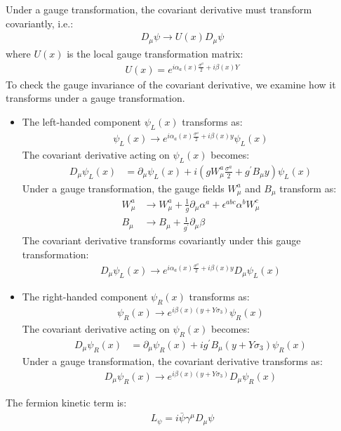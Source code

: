 \begin{enumerate}
Under a gauge transformation, the covariant derivative must transform covariantly, i.e.:
\begin{align}
    D_\mu \psi \to U(x) D_\mu \psi
\end{align}
where $U(x)$ is the local gauge transformation matrix:
\begin{align}
    U(x) = e^{\displaystyle i \alpha_a(x) \frac{\sigma^a}{2} + i \beta(x) Y}
\end{align}
To check the gauge invariance of the covariant derivative, we examine how it transforms under a gauge transformation.
\begin{itemize}
    \item The left-handed component $\psi_L(x)$ transforms as:
   \begin{align}
       \psi_L(x) \to e^{\displaystyle i \alpha_a(x) \frac{\sigma^a}{2} + i \beta(x) y} \psi_L(x)
   \end{align}
   The covariant derivative acting on $\psi_L(x)$ becomes:
   \begin{align}
       D_\mu \psi_L(x) &= \partial_\mu \psi_L(x) + i \left( g W_\mu^a \frac{\sigma^a}{2} + g^\prime  B_\mu y \right) \psi_L(x)
   \end{align}
   Under a gauge transformation, the gauge fields $W_\mu^a$ and $B_\mu$ transform as:
   \begin{align}
       W_\mu^a &\to W_\mu^a + \frac{1}{g} \partial_\mu \alpha^a + \epsilon^{abc} \alpha^b W_\mu^c \\
       B_\mu &\to B_\mu + \frac{1}{g^\prime } \partial_\mu \beta
   \end{align}
   The covariant derivative transforms covariantly under this gauge transformation:
   \begin{align}
       D_\mu \psi_L(x) \to e^{\displaystyle i \alpha_a(x) \frac{\sigma^a}{2} + i \beta(x) y} D_\mu \psi_L(x)
   \end{align}
\item The right-handed component $\psi_R(x)$ transforms as:
   \begin{align}
       \psi_R(x) \to e^{\displaystyle i \beta(x) (y + Y \sigma_3)} \psi_R(x)
   \end{align}
   The covariant derivative acting on $\psi_R(x)$ becomes:
   \begin{align}
       D_\mu \psi_R(x) &= \partial_\mu \psi_R(x) + i g^\prime  B_\mu (y + Y \sigma_3) \psi_R(x)
   \end{align}
   Under a gauge transformation, the covariant derivative transforms as:
   \begin{align}
       D_\mu \psi_R(x) \to e^{\displaystyle i \beta(x) (y + Y \sigma_3)} D_\mu \psi_R(x)
   \end{align}
\end{itemize}
The fermion kinetic term is:
\begin{align}
    L_{\psi} = i \bar{\psi} \gamma^\mu D_\mu \psi
\end{align}


\end{enumerate}
